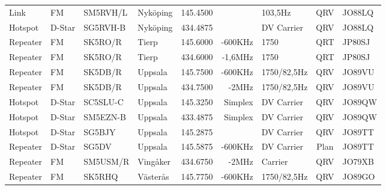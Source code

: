 \begin{landscape}
\begin{longtable}{llllrrlcl}
	Link              & FM           & SM5RVH/L      & Nyköping          &          145.4500 &                & 103,5Hz         &       QRV       & JO88LQ           \\
	Hotspot           & D-Star       & SG5RVH-B      & Nyköping          &          434.4875 &                & DV Carrier      &       QRV       & JO88LQ           \\
	Repeater          & FM           & SK5RO/R       & Tierp             &          145.6000 &        -600KHz & 1750            &       QRT       & JP80SJ           \\
	Repeater          & FM           & SK5RO/R       & Tierp             &          434.6000 &        -1,6MHz & 1750            &       QRT       & JP80SJ           \\
	Repeater          & FM           & SK5DB/R       & Uppsala           &          145.7500 &        -600KHz & 1750/82,5Hz     &       QRV       & JO89VU           \\
	Repeater          & FM           & SK5DB/R       & Uppsala           &          434.7500 &          -2MHz & 1750/82,5Hz     &       QRV       & JO89VU           \\
	Hotspot           & D-Star       & SC5SLU-C      & Uppsala           &          145.3250 &        Simplex & DV Carrier      &       QRV       & JO89QW           \\
	Hotspot           & D-Star       & SM5EZN-B      & Uppsala           &          433.4875 &        Simplex & DV Carrier      &       QRV       & JO89QW           \\
	Hotspot           & D-Star       & SG5BJY        & Uppsala           &          145.2875 &                & DV Carrier      &       QRV       & JO89TT           \\
	Repeater          & D-Star       & SG5DV         & Uppsala           &          145.5875 &        -600KHz & DV Carrier      &      Plan       & JO89TT           \\
	Repeater          & FM           & SM5USM/R      & Vingåker          &          434.6750 &          -2MHz & Carrier         &       QRV       & JO79XB           \\
	Repeater          & FM           & SK5RHQ        & Västerås          &          145.7750 &        -600KHz & 1750/82,5Hz     &       QRV       & JO89GO
\end{longtable}
\normalsize

\end{landscape}
